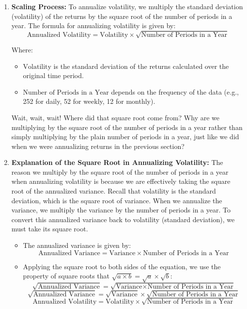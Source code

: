 \documentclass{article}
\begin{document}
\begin{enumerate}    
    \item \textbf{Scaling Process:}
        To annualize volatility, we multiply the standard deviation (volatility) of the returns by the square root of the number of periods in a year. The formula for annualizing volatility is given by:
        \[ \text{Annualized Volatility} = \text{Volatility} \times \sqrt{\text{Number of Periods in a Year}} \]
    
        Where:
        \begin{itemize}
            \item $\text{Volatility}$ is the standard deviation of the returns calculated over the original time period.
            \item $\text{Number of Periods in a Year}$ depends on the frequency of the data (e.g., 252 for daily, 52 for weekly, 12 for monthly).
        \end{itemize}

        Wait, wait, wait! Where did that square root come from? Why are we multiplying by the square root of the number of periods in a year rather than simply multiplying by the plain number of periods in a year, just like we did when we were annualizing returns in the previous section?

    \item \textbf{Explanation of the Square Root in Annualizing Volatility:}
    The reason we multiply by the square root of the number of periods in a year when annualizing volatility is because we are effectively taking the square root of the annualized variance. Recall that volatility is the standard deviation, which is the square root of variance. When we annualize the variance, we multiply the variance by the number of periods in a year. To convert this annualized variance back to volatility (standard deviation), we must take its square root.

    \begin{itemize}
        \item The annualized variance is given by:
        \[ \text{Annualized Variance} = \text{Variance} \times \text{Number of Periods in a Year} \]
        
        \item Applying the square root to both sides of the equation, we use the property of square roots that $\sqrt{a \times b} = \sqrt{a} \times \sqrt{b}$:
        \[ \sqrt{\text{Annualized Variance}} = \sqrt{\text{Variance} \times \text{Number of Periods in a Year}} \]
        \[ \sqrt{\text{Annualized Variance}} = \sqrt{\text{Variance}}  \times \sqrt{\text{Number of Periods in a Year}} \]
        \[ \text{Annualized Volatility} = \text{Volatility} \times \sqrt{\text{Number of Periods in a Year}} \]


\end{itemize}
\end{enumerate}
\end{document}
